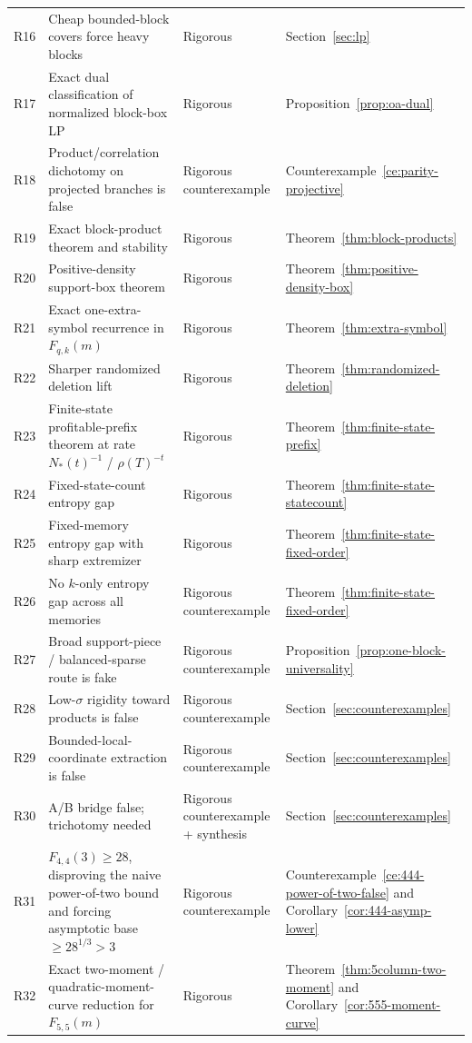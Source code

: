 \documentclass[11pt]{article}
\theoremstyle{definition}
\newcommand{\1}{\mathbf{1}}
\begin{document}
\begin{longtable}{p{}p{}p{}p{}}
R16 & Cheap bounded-block covers force heavy blocks & Rigorous & Section~\ref{sec:lp}\\
R17 & Exact dual classification of normalized block-box LP & Rigorous & Proposition~\ref{prop:oa-dual}\\
R18 & Product/correlation dichotomy on projected branches is false & Rigorous counterexample & Counterexample~\ref{ce:parity-projective}\\
R19 & Exact block-product theorem and stability & Rigorous & Theorem~\ref{thm:block-products}\\
R20 & Positive-density support-box theorem & Rigorous & Theorem~\ref{thm:positive-density-box}\\
R21 & Exact one-extra-symbol recurrence in $F_{q,k}(m)$ & Rigorous & Theorem~\ref{thm:extra-symbol}\\
R22 & Sharper randomized deletion lift & Rigorous & Theorem~\ref{thm:randomized-deletion}\\
R23 & Finite-state profitable-prefix theorem at rate $N_*(t)^{-1}$ / $\rho(T)^{-t}$ & Rigorous & Theorem~\ref{thm:finite-state-prefix}\\
R24 & Fixed-state-count entropy gap & Rigorous & Theorem~\ref{thm:finite-state-statecount}\\
R25 & Fixed-memory entropy gap with sharp extremizer & Rigorous & Theorem~\ref{thm:finite-state-fixed-order}\\
R26 & No $k$-only entropy gap across all memories & Rigorous counterexample & Theorem~\ref{thm:finite-state-fixed-order}\\
R27 & Broad support-piece / balanced-sparse route is fake & Rigorous counterexample & Proposition~\ref{prop:one-block-universality}\\
R28 & Low-$\sigma$ rigidity toward products is false & Rigorous counterexample & Section~\ref{sec:counterexamples}\\
R29 & Bounded-local-coordinate extraction is false & Rigorous counterexample & Section~\ref{sec:counterexamples}\\
R30 & A/B bridge false; trichotomy needed & Rigorous counterexample + synthesis & Section~\ref{sec:counterexamples}\\
R31 & $F_{4,4}(3)\ge 28$, disproving the naive power-of-two bound and forcing asymptotic base $\ge 28^{1/3}>3$ & Rigorous counterexample & Counterexample~\ref{ce:444-power-of-two-false} and Corollary~\ref{cor:444-asymp-lower}\\
R32 & Exact two-moment / quadratic-moment-curve reduction for $F_{5,5}(m)$ & Rigorous & Theorem~\ref{thm:5column-two-moment} and Corollary~\ref{cor:555-moment-curve}\\

\end{longtable}
\end{document}
